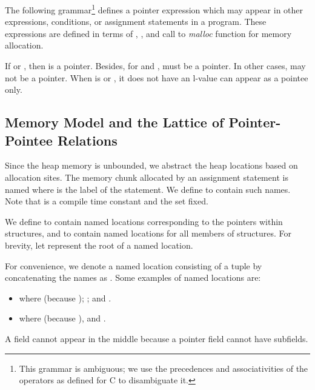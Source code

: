 \documentclass[a4paper,11pt,fleqn]{article}
\begin{document}
The following grammar\footnote{This grammar is ambiguous; we use the
precedences and associativities of the operators as defined for C to
disambiguate it.} defines a pointer expression  
which may appear in other expressions, conditions,
or assignment statements in a program. These expressions are defined
in terms of \text{}, \text{}, and
call to {\em malloc\/} function for memory allocation.

If \text{} or \text{}, then  is a
pointer. Besides, for \text{} and \text{},  must be a pointer. In other cases,  may not be a
pointer. When  is  or \text{}, it
does not have an l-value can appear as a pointee only.

\subsection{Memory Model and the Lattice of Pointer-Pointee Relations}

Since the heap memory is unbounded, we abstract the heap locations based
on allocation sites. The memory chunk allocated by an
assignment statement  is named  where  is the
label of the statement. We define \heap to contain such names. Note that  is a compile time constant
and the set \heap fixed.

\newcommand{\structp}{\text{\sf\em S}\xspace}
\newcommand{\structm}{\text{\sf\em S}\xspace}
\newcommand{\genp}{\text{\sf\em G}\xspace}
\newcommand{\genm}{\text{\sf\em G}\xspace}
\newcommand{\rootp}{\text{\sf\em R\/}\xspace}
\newcommand{\source}{\text{\sf\em S\/}\xspace}
\newcommand{\target}{\text{\sf\em T\/}\xspace}
\newcommand{\inner}{\text{\sf\em inner\_level\/}\xspace}
\newcommand{\sibling}{\text{\sf\em same\_level\/}\xspace}
\newcommand{\coincides}{\text{\sf\em coincides\/}\xspace}

We define \structp to contain named locations corresponding to the pointers within structures, and \structm to
contain named locations for all members of structures.
For brevity, let \text{} represent the root of a named location. 

For convenience, we denote a named location consisting of a tuple \text{} by concatenating the names
as \text{}.
Some examples of named locations are: 
\begin{itemize}
\item \text{} where \text{} (because \text{}); \text{}; and \text{}.
\item  \text{} where \text{} 
      (because \text{}), and \text{}. 
\end{itemize}
A field \text{} cannot appear in the middle
because a pointer field cannot have subfields.                                                        
\end{document}
